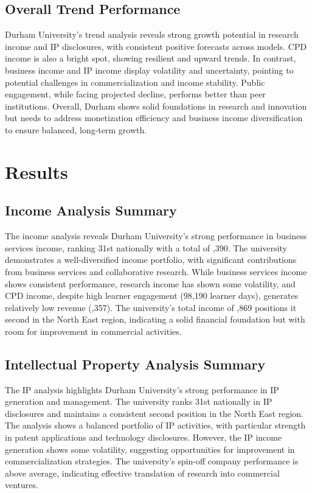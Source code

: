 \documentclass[journal,onecolumn, 10pt,draftclsnofoot]{IEEEtran}
\begin{document}
\subsection{Overall Trend Performance}

Durham University's trend analysis reveals strong growth potential in research income and IP disclosures, with consistent positive forecasts across models. CPD income is also a bright spot, showing resilient and upward trends. In contrast, business income and IP income display volatility and uncertainty, pointing to potential challenges in commercialization and income stability. Public engagement, while facing projected decline, performs better than peer institutions. Overall, Durham shows solid foundations in research and innovation but needs to address monetization efficiency and business income diversification to ensure balanced, long-term growth.

\section{Results}

\subsection{Income Analysis Summary}

The income analysis reveals Durham University's strong performance in business services income, ranking 31st nationally with a total of ,390. The university demonstrates a well-diversified income portfolio, with significant contributions from business services and collaborative research. While business services income shows consistent performance, research income has shown some volatility, and CPD income, despite high learner engagement (98,190 learner days), generates relatively low revenue (,357). The university's total income of ,869 positions it second in the North East region, indicating a solid financial foundation but with room for improvement in commercial activities.

\subsection{Intellectual Property Analysis Summary}

The IP analysis highlights Durham University's strong performance in IP generation and management. The university ranks 31st nationally in IP disclosures and maintains a consistent second position in the North East region. The analysis shows a balanced portfolio of IP activities, with particular strength in patent applications and technology disclosures. However, the IP income generation shows some volatility, suggesting opportunities for improvement in commercialization strategies. The university's spin-off company performance is above average, indicating effective translation of research into commercial ventures.
\end{document}
